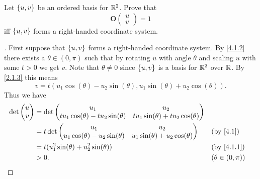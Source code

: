 \begin{ex}\label{ex:4.1.12}
  Let \(\left\lbrace u, v\right\rbrace\) be an ordered basis for \(\mathbb{R}^2\).
  Prove that
  \[
    \mathbf{O}\begin{pmatrix}
      u \\
      v
    \end{pmatrix} = 1
  \]
  iff \(\left\lbrace u, v\right\rbrace\) forms a right-handed coordinate system.
\end{ex}

\begin{proof}[]
  First suppose that \(\left\lbrace u, v\right\rbrace\) forms a right-handed coordinate system.
  By \cref{4.1.2} there exists a \(\theta \in (0, \pi)\) such that by rotating \(u\) with angle \(\theta\) and scaling \(u\) with some \(t > 0\) we get \(v\).
  Note that \(\theta \neq 0\) since \(\left\lbrace u, v\right\rbrace\) is a basis for \(\mathbb{R}^2\) over \(\mathbb{R}\).
  By \cref{2.1.3} this means
  \[
    v = t (u_1 \cos(\theta) - u_2 \sin(\theta), u_1 \sin(\theta) + u_2 \cos(\theta)).
  \]
  Thus we have
  \begin{align*}
    \det\begin{pmatrix}
          u \\
          v
        \end{pmatrix} & = \det\begin{pmatrix}
                                u_1                                     & u_2                                     \\
                                t u_1 \cos(\theta) - t u_2 \sin(\theta) & t u_1 \sin(\theta) + t u_2 \cos(\theta)
                              \end{pmatrix}                           \\
                        & = t \det\begin{pmatrix}
                                    u_1                                 & u_2                                 \\
                                    u_1 \cos(\theta) - u_2 \sin(\theta) & u_1 \sin(\theta) + u_2 \cos(\theta)
                                  \end{pmatrix}         &  & \by{4.1}                               \\
                        & = t (u_1^2 \sin(\theta) + u_2^2 \sin(\theta))                                        &  & \by{4.1.1}            \\
                        & > 0.                                                                                 &  & (\theta \in (0, \pi))

\end{align*}
\end{proof}
